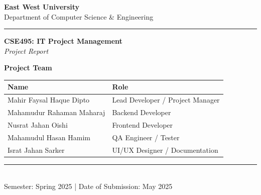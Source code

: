 \documentclass[12pt,a4paper]{report}
\begin{document}
\begin{titlepage}
  \centering
  \vspace*{1cm}

  {\Large\textbf{East West University}}\\[0.3cm]
  {\large Department of Computer Science \& Engineering}\\[0.2cm]
  \rule{\linewidth}{0.5pt}

  \vspace{1.5cm}

  {\LARGE\textbf{\textcolor{primaryblue}{CSE495: IT Project Management}}}\\[0.4cm]
  {\large\textit{Project Report}}

  \vspace{1.5cm}


  \vspace{1.5cm}

  {\large\textbf{Project Team}}\\[0.5cm]
  \begin{tabular}{ll}
    \toprule
    \textbf{Name} & \textbf{Role} \\
    \midrule
    Mahir Faysal Haque Dipto   & Lead Developer / Project Manager \\
    Mahamudur Rahaman Maharaj  & Backend Developer \\
    Nusrat Jahan Oishi         & Frontend Developer \\
    Mahamudul Hasan Hamim      & QA Engineer / Tester \\
    Israt Jahan Sarker         & UI/UX Designer / Documentation \\
    \bottomrule
  \end{tabular}

  \vfill

  \rule{\linewidth}{0.5pt}\\[0.3cm]
  {\large Semester: Spring 2025 \quad | \quad Date of Submission: May 2025}

\end{titlepage}

\tableofcontents
\newpage
\end{document}
